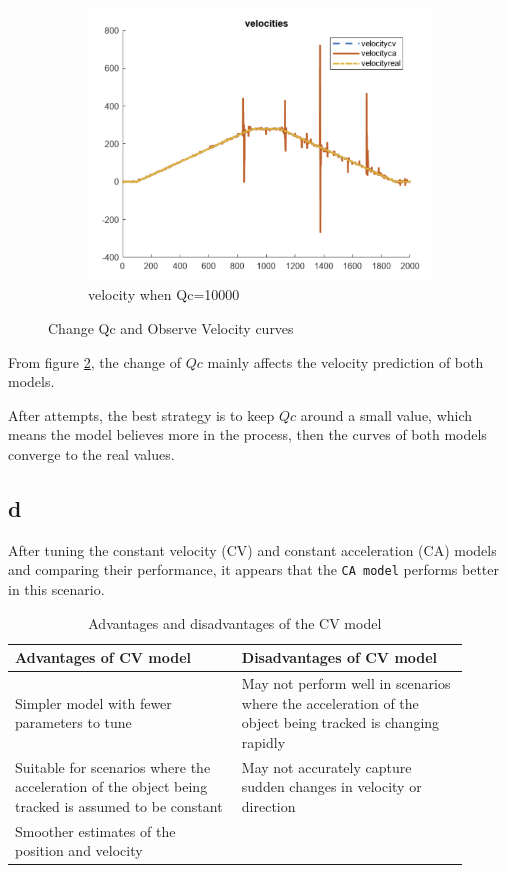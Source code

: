 \begin{figure}[H]
\begin{subfigure}[b]{0.3\textwidth}
        \includegraphics[width=\textwidth]{images/velocityQc=10000.png}
        \caption{velocity when Qc=10000}
        \label{velocityQc=10000}
    \end{subfigure}
    \caption{Change Qc and Observe Velocity curves}
    \label{22}
\end{figure}

From figure \ref{22}, the change of $Qc$ mainly affects the velocity prediction of both models.

After attempts, the best strategy is to keep $ Qc $ around a small value, which means the model believes more in the process, then the curves of both models converge to the real values.

\subsection{d}

After tuning the constant velocity (CV) and constant acceleration (CA) models and comparing their performance, it appears that the \texttt{CA model} performs better in this scenario.\\

\begin{table}[h]
    \centering
    \begin{tabular}{|p{0.45\linewidth}|p{0.45\linewidth}|}
    \hline
    \textbf{Advantages of CV model} & \textbf{Disadvantages of CV model} \\
    \hline
    Simpler model with fewer parameters to tune & May not perform well in scenarios where the acceleration of the object being tracked is changing rapidly \\
    \hline
    Suitable for scenarios where the acceleration of the object being tracked is assumed to be constant & May not accurately capture sudden changes in velocity or direction \\
    \hline
    Smoother estimates of the position and velocity & \\
    \hline
    \end{tabular}
    \caption{Advantages and disadvantages of the CV model}
    \end{table}


